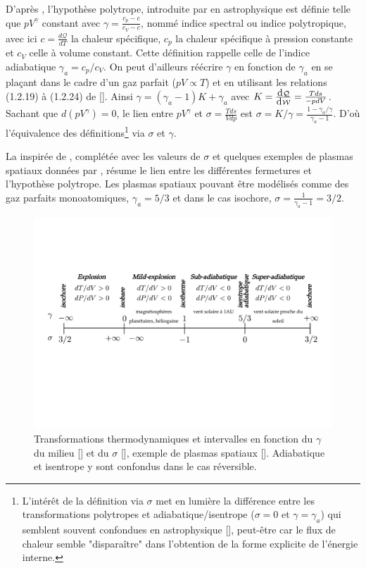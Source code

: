 D'après \cite{horedt_polytropes_2004}, l'hypothèse polytrope, introduite par \cite{chandrasekhar_introduction_1939} en astrophysique est définie telle que $pV^{\gamma}$ constant avec $\gamma = \frac{c_p - c}{c_V - c}$, nommé indice spectral ou indice polytropique, avec ici $c=\frac{d\mathcal{Q}}{dT}$ la chaleur spécifique, $c_p$ la chaleur spécifique à pression constante et $c_V$ celle à volume constant. Cette définition rappelle celle de l'indice adiabatique $\gamma_a = c_p/c_V$. On peut d'ailleurs réécrire $\gamma$ en fonction de $\gamma_a$ en se plaçant dans le cadre d'un gaz parfait ($pV \propto T$) et en utilisant les relations (1.2.19) à (1.2.24) de [\cite{horedt_polytropes_2004}]. Ainsi $\gamma = \left(\gamma_a - 1\right) K + \gamma_a$ avec $K = \frac{\dj  \mathcal{Q}}{\dj \mathcal{W}} = \frac{Tds}{-pdV}$. Sachant que $d\left(pV^{\gamma}\right) = 0$, le lien entre $pV^{\gamma}$ et $\sigma = \frac{Tds}{Vdp}$ est $\sigma = K/\gamma = \frac{1-\gamma_a/\gamma}{\gamma_a-1}$. D'où l'équivalence des définitions\footnote{L'intérêt de la définition via $\sigma$ met en lumière la différence entre les transformations polytropes et adiabatique/isentrope ($\sigma = 0 $ et $\gamma = \gamma_a$) qui semblent souvent confondues en astrophysique [\cite{eyink_cascades_2018}], peut-être car le flux de chaleur semble "disparaître" dans l'obtention de la forme explicite de l'énergie interne.} via $\sigma$ et $\gamma$. 

La  inspirée de \cite{livadiotis_non-equilibrium_2012}, complétée avec les valeurs de $\sigma$ et quelques exemples de plasmas spatiaux données par \cite{livadiotis_long-term_2018}, résume le lien entre les différentes fermetures et l'hypothèse polytrope. Les plasmas spatiaux pouvant être modélisés comme des gaz parfaits monoatomiques, $\gamma_a = 5/3$ et dans le cas isochore, $\sigma = \frac{1}{\gamma_a-1}=3/2$.
\begin{figure}[!ht]
 \centering
\includegraphics[width=0.9\linewidth,trim=1cm 8cm 1cm 5.5cm, clip=true]{./Part_1/images/schema_thermo.pdf}
\caption{Transformations thermodynamiques et intervalles en fonction du $\gamma$ du milieu [\cite{livadiotis_non-equilibrium_2012}] et du $\sigma$ [\cite{borel_thermodynamique_2005}], exemple de plasmas spatiaux [\cite{livadiotis_long-term_2018}]. Adiabatique et isentrope y sont confondus dans le cas réversible.}
\label{fig:schema_thermo}
\end{figure}

